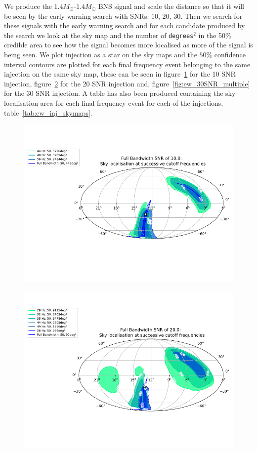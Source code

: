 We produce the $1.4M_\odot$-$1.4M_\odot$ BNS signal and scale the distance so that it will be seen by the early warning search with SNRs: $10$, $20$, $30$. Then we search for these signals with the early warning search and for each candidate produced by the search we look at the sky map and the number of \verb|degrees|$^2$ in the 50\% credible area to see how the signal becomes more localised as more of the signal is being seen. We plot injection as a star on the sky maps and the $50\%$ confidence interval contours are plotted for each final frequency event belonging to the same injection on the same sky map, these can be seen in figure~\ref{fig:ew_10SNR_multiple} for the 10 SNR injection, figure~\ref{fig:ew_20SNR_multiple} for the 20 SNR injection and, figure~\ref{fig:ew_30SNR_multiple} for the 30 SNR injection. A table has also been produced containing the sky localisation area for each final frequency event for each of the injections, table~\ref{tab:ew_inj_skymaps}.
%
\begin{figure}
    \centering
    \includegraphics[width=\textwidth]{images/ew/10SNR_multiple.png}
    \caption{}
    \label{fig:ew_10SNR_multiple}
\end{figure}
%
\begin{figure}
    \centering
    \includegraphics[width=\textwidth]{images/ew/20SNR_multiple.png}
    \caption{}
    \label{fig:ew_20SNR_multiple}
\end{figure}
